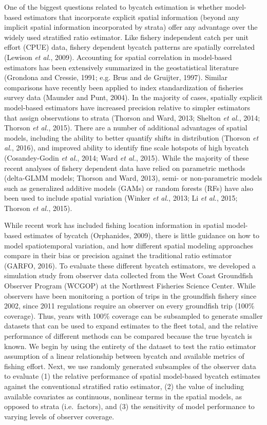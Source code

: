 \documentclass[]{article}
\begin{document}
One of the biggest questions related to bycatch estimation is whether
model-based estimators that incorporate explicit spatial information
(beyond any implicit spatial information incorporated by strata) offer
any advantage over the widely used stratified ratio estimator. Like
fishery independent catch per unit effort (CPUE) data, fishery dependent
bycatch patterns are spatially correlated (Lewison \emph{et al.}, 2009).
Accounting for spatial correlation in model-based estimators has been
extensively summarized in the geostatistical literature (Grondona and
Cressie, 1991; e.g. Brus and de Gruijter, 1997). Similar comparisons
have recently been applied to index standardization of fisheries survey
data (Maunder and Punt, 2004). In the majority of cases, spatially
explicit model-based estimators have increased precision relative to
simpler estimators that assign observations to strata (Thorson and Ward,
2013; Shelton \emph{et al.}, 2014; Thorson \emph{et al.}, 2015). There
are a number of additional advantages of spatial models, including the
ability to better quantify shifts in distribution (Thorson \emph{et
al.}, 2016), and improved ability to identify fine scale hotspots of
high bycatch (Cosandey-Godin \emph{et al.}, 2014; Ward \emph{et al.},
2015). While the majority of these recent analyses of fishery dependent
data have relied on parametric methods (delta-GLMM models; Thorson and
Ward, 2013), semi- or non-parametric models such as generalized additive
models (GAMs) or random forests (RFs) have also been used to include
spatial variation (Winker \emph{et al.}, 2013; Li \emph{et al.}, 2015;
Thorson \emph{et al.}, 2015).

While recent work has included fishing location information in spatial
model-based estimates of bycatch (Orphanides, 2009), there is little
guidance on how to model spatiotemporal variation, and how different
spatial modeling approaches compare in their bias or precision against
the traditional ratio estimator (GARFO, 2016). To evaluate these
different bycatch estimators, we developed a simulation study from
observer data collected from the West Coast Groundfish Observer Program
(WCGOP) at the Northwest Fisheries Science Center. While observers have
been monitoring a portion of trips in the groundfish fishery since 2002,
since 2011 regulations require an observer on every groundfish trip
(100\% coverage). Thus, years with 100\% coverage can be subsampled to
generate smaller datasets that can be used to expand estimates to the
fleet total, and the relative performance of different methods can be
compared because the true bycatch is known. We begin by using the
entirety of the dataset to test the ratio estimator assumption of a
linear relationship between bycatch and available metrics of fishing
effort. Next, we use randomly generated subsamples of the observer data
to evaluate (1) the relative performance of spatial model-based bycatch
estimates against the conventional stratified ratio estimator, (2) the
value of including available covariates as continuous, nonlinear terms
in the spatial models, as opposed to strata (i.e.~factors), and (3) the
sensitivity of model performance to varying levels of observer coverage.
\end{document}
